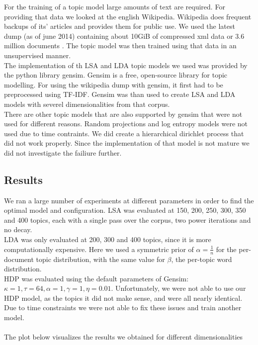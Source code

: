 For the training of a topic model large amounts of text are required. For providing that data we looked at the english Wikipedia. Wikipedia does frequent backups of its' articles and provides them for public use. We used the latest dump (as of june 2014) containing about 10GiB of compressed xml data or 3.6 million documents \cite{wikidumps}. The topic model was then trained using that data in an unsupervised manner.\\
The implementation of th LSA and LDA topic models we used was provided by the python library gensim. Gensim is a free, open-source library for topic modelling. For using the wikipedia dump with gensim, it first had to be preprocessed using TF-IDF. Gensim was than used to create LSA and LDA models with severel dimensionalities from that corpus.\\
There are other topic models that are also supported by gensim that were not used for different reasons. Random projections \cite{RandomProjections, gensimRP} and log entropy \cite{LogEntropy, gensimLE} models were not used due to time contraints. We did create a hierarchical dirichlet process \cite{hdp, gensimHdp} that did not work properly. Since the implementation of that model is not mature \cite{gensimHdp} we did not investigate the failiure further.





\subsection{Results}
We ran a large number of experiments at different parameters in order to find the optimal model and configuration. LSA was evaluated at 150, 200, 250, 300, 350 and 400 topics, each with a single pass over the corpus, two power iterations and no decay.\\ 
LDA was only evaluated at 200, 300 and 400 topics, since it is more computationally expensive. Here we used a symmetric prior of $\alpha = \frac{1}{n}$ for the per-document topic distribution, with the same value for $\beta$, the per-topic word distribution.\\
HDP was evaluated using the default parameters of Gensim: $\kappa = 1, \tau = 64, \alpha =1, \gamma =1, \eta =0.01$. Unfortunately, we were not able to use our HDP model, as the topics it did not make sense, and were all nearly identical. Due to time constraints we were not able to fix these issues and train another model.\\\\
The plot below visualizes the results we obtained for different dimensionalities 


